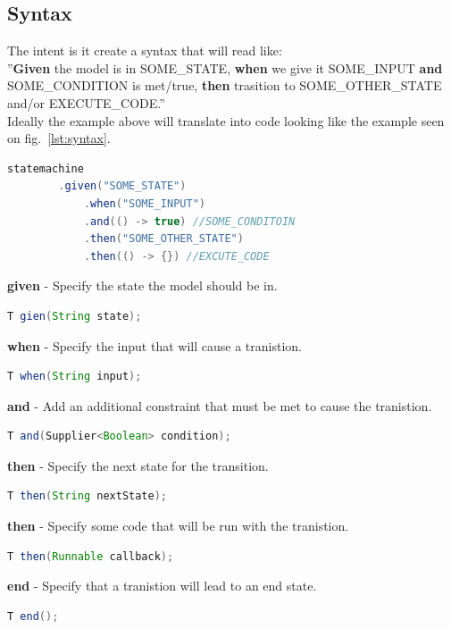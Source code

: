 \documentclass{article}
\begin{document}
\subsection{Syntax}

The intent is it create a syntax that will read like:\\
''\textbf{Given} the model is in SOME\_STATE, \textbf{when} we give it SOME\_INPUT \textbf{and} SOME\_CONDITION is met/true, \textbf{then} trasition to SOME\_OTHER\_STATE  and/or EXECUTE\_CODE.''\\

\noindent Ideally the example above will translate into code looking like the example seen on fig.~\ref{lst:syntax}.
\begin{lstlisting}[language=java, caption={Example of Intented API Usage}, captionpos=b, label={lst:syntax}]
    statemachine
        .given("SOME_STATE")
            .when("SOME_INPUT")
            .and(() -> true) //SOME_CONDITOIN
            .then("SOME_OTHER_STATE")
            .then(() -> {}) //EXCUTE_CODE
\end{lstlisting}

\textbf{given} - Specify the state the model should be in.
\begin{lstlisting}[language=java]
    T gien(String state);
\end{lstlisting}

\textbf{when} - Specify the input that will cause a tranistion.
\begin{lstlisting}[language=java]
    T when(String input);
\end{lstlisting}

\textbf{and} - Add an additional constraint that must be met to cause the tranistion.
\begin{lstlisting}[language=java]
    T and(Supplier<Boolean> condition);
\end{lstlisting}

\textbf{then} - Specify the next state for the transition.
\begin{lstlisting}[language=java]
    T then(String nextState);
\end{lstlisting}

\textbf{then} - Specify some code that will be run with the tranistion.
\begin{lstlisting}[language=java]
    T then(Runnable callback);
\end{lstlisting}

\textbf{end} - Specify that a tranistion will lead to an end state.
\begin{lstlisting}[language=java]
    T end();
\end{lstlisting}
\end{document}
